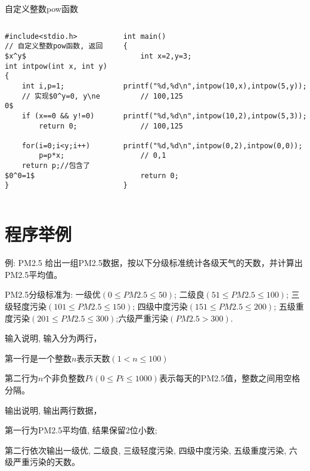\begin{frame}{自定义整数pow函数}
\vspace{-0.5cm}
\begin{columns}[T]
\begin{lstlisting}
#include<stdio.h>
// 自定义整数pow函数, 返回$x^y$
int intpow(int x, int y)
{
	int i,p=1;
	// 实现$0^y=0, y\ne 0$
	if (x==0 && y!=0) 
		return 0;
		 
	for(i=0;i<y;i++) 
		p=p*x;
	return p;//包含了$0^0=1$
} 
\end{lstlisting}
\begin{lstlisting}[frame=leftline]
int main()
{
	int x=2,y=3;
	
	printf("%d,%d\n",intpow(10,x),intpow(5,y)); 
	// 100,125
	printf("%d,%d\n",intpow(10,2),intpow(5,3)); 
	// 100,125
	printf("%d,%d\n",intpow(0,2),intpow(0,0)); 
	// 0,1 
	
	return 0;
}
\end{lstlisting}
\end{columns}
\end{frame}



\section{程序举例}

\begin{frame}{例: PM2.5}
给出一组PM2.5数据，按以下分级标准统计各级天气的天数，并计算出PM2.5平均值。

PM2.5分级标准为: 
一级优$(0\le PM2.5\le 50)$; 二级良$(51\le PM2.5\le 100)$;  三级轻度污染$(101\le PM2.5\le 150)$; 四级中度污染$(151\le PM2.5\le 200)$; 五级重度污染$(201\le PM2.5\le 300)$;六级严重污染$(PM2.5>300)$.

输入说明, 输入分为两行，

第一行是一个整数$n$表示天数$(1<n\le 100)$ 

第二行为$n$个非负整数$Pi(0\le Pi\le 1000)$表示每天的PM2.5值，整数之间用空格分隔。

输出说明, 输出两行数据，

第一行为PM2.5平均值, 结果保留2位小数; 

第二行依次输出一级优, 二级良, 三级轻度污染, 四级中度污染, 五级重度污染, 六级严重污染的天数。
\end{frame}

